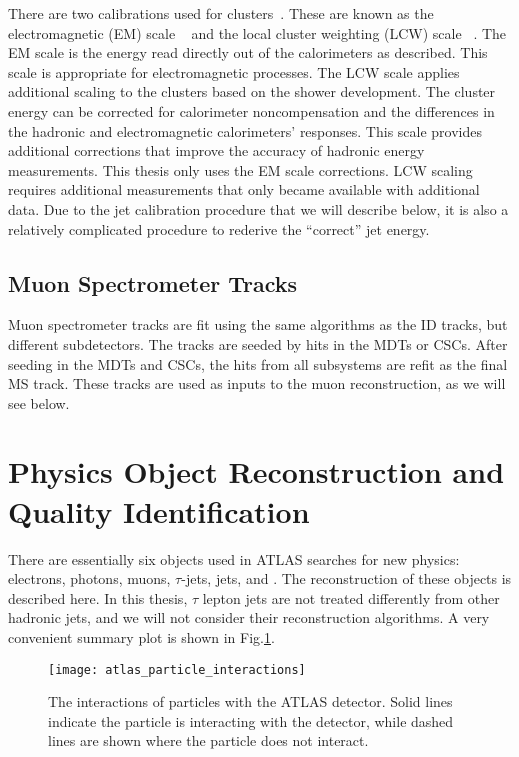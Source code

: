 There are two calibrations used for clusters~\cite{PERF-2011-04}.
These are known as the electromagnetic (EM) scale ~\cite{PERF-2010-04} and the local cluster weighting (LCW) scale ~\cite{PERF-2014-07}.
The EM scale is the energy read directly out of the calorimeters as described.
This scale is appropriate for electromagnetic processes.
The LCW scale applies additional scaling to the clusters based on the shower development.
The cluster energy can be corrected for calorimeter noncompensation and the differences in the hadronic and electromagnetic calorimeters' responses.
This scale provides additional corrections that improve the accuracy of hadronic energy measurements.
This thesis only uses the EM scale corrections.
LCW scaling requires additional measurements that only became available with additional data.
Due to the jet calibration procedure that we will describe below, it is also a relatively complicated procedure to rederive the ``correct'' jet energy.

\subsection{Muon Spectrometer Tracks}\label{sec:ms_tracks}

Muon spectrometer tracks are fit using the same algorithms as the ID tracks, but different subdetectors.
The tracks are seeded by hits in the MDTs or CSCs.
After seeding in the MDTs and CSCs, the hits from all subsystems are refit as the final MS track.
These tracks are used as inputs to the muon reconstruction, as we will see below.

\section{Physics Object Reconstruction and Quality Identification}

There are essentially six objects used in ATLAS searches for new physics: electrons, photons, muons, $\tau$-jets, jets, and \met.
The reconstruction of these objects is described here.
In this thesis, $\tau$ lepton jets are not treated differently from other hadronic jets, and we will not consider their reconstruction algorithms.
A very convenient summary plot is shown in Fig.\ref{fig:atlas_interactions}.
\begin{figure}
\caption{The interactions of particles with the ATLAS detector.
Solid lines indicate the particle is interacting with the detector, while dashed lines are shown where the particle does not interact.} \label{fig:atlas_interactions}
\texttt{[image: atlas\_particle\_interactions]}
\end{figure}

